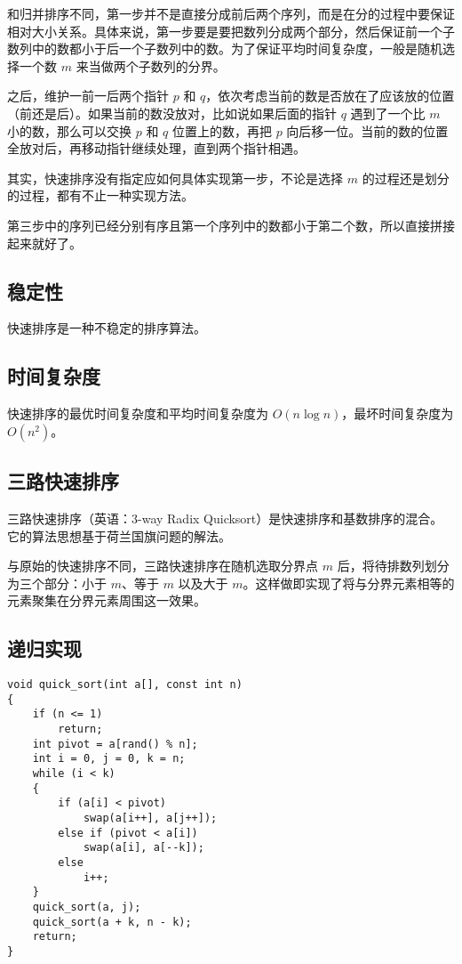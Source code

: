 \documentclass[12pt]{article}
\begin{document}
和归并排序不同，第一步并不是直接分成前后两个序列，而是在分的过程中要保证相对大小关系。具体来说，第一步要是要把数列分成两个部分，然后保证前一个子数列中的数都小于后一个子数列中的数。为了保证平均时间复杂度，一般是随机选择一个数 $m$ 来当做两个子数列的分界。

之后，维护一前一后两个指针 $p$ 和 $q$，依次考虑当前的数是否放在了应该放的位置（前还是后）。如果当前的数没放对，比如说如果后面的指针 $q$ 遇到了一个比 $m$ 小的数，那么可以交换 $p$ 和 $q$ 位置上的数，再把 $p$ 向后移一位。当前的数的位置全放对后，再移动指针继续处理，直到两个指针相遇。

其实，快速排序没有指定应如何具体实现第一步，不论是选择 $m$ 的过程还是划分的过程，都有不止一种实现方法。

第三步中的序列已经分别有序且第一个序列中的数都小于第二个数，所以直接拼接起来就好了。

\subsection{稳定性}

快速排序是一种不稳定的排序算法。

\subsection{时间复杂度}

快速排序的最优时间复杂度和平均时间复杂度为 $O(n\log n)$，最坏时间复杂度为 $O(n^2)$。

\subsection{三路快速排序}

三路快速排序（英语：3-way Radix Quicksort）是快速排序和基数排序的混合。它的算法思想基于荷兰国旗问题的解法。

与原始的快速排序不同，三路快速排序在随机选取分界点 $m$ 后，将待排数列划分为三个部分：小于 $m$、等于 $m$ 以及大于 $m$。这样做即实现了将与分界元素相等的元素聚集在分界元素周围这一效果。

\subsection{递归实现}

{\setmainfont{Consolas} %
\begin{lstlisting}
void quick_sort(int a[], const int n)
{
    if (n <= 1)
        return;
    int pivot = a[rand() % n];
    int i = 0, j = 0, k = n;
    while (i < k)
    {
        if (a[i] < pivot)
            swap(a[i++], a[j++]);
        else if (pivot < a[i])
            swap(a[i], a[--k]);
        else
            i++;
    }
    quick_sort(a, j);
    quick_sort(a + k, n - k);
    return;
}
\end{lstlisting}
}
\end{document}
